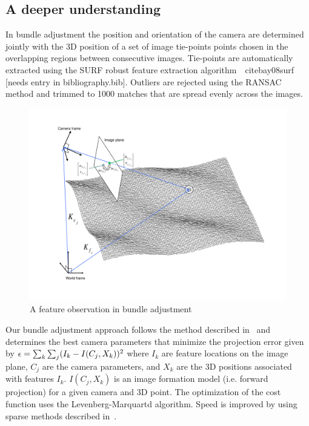 \subsection{A deeper understanding}

In bundle adjustment the position and orientation of the camera are
determined jointly with the 3D position of a set of image tie-points
points chosen in the overlapping regions between consecutive images.
Tie-points are automatically extracted using the SURF robust feature
extraction algorithm~\ cite{bay08surf} [needs entry in bibliography.bib].  Outliers are rejected using
the RANSAC method and trimmed to 1000 matches that are spread evenly
across the images.

\begin{figure}[htp]
  \begin{center}
  \includegraphics[trim=20mm 20mm 20mm 15mm,clip,width=6in]{images/ba_feature_observation.pdf}
  \end{center}
  \caption{ A feature observation in bundle adjustment \citep{moore09} }
  \label{fig:ba_feature}
\end{figure}

Our bundle adjustment approach follows the method described
in~\cite{triggs00} and determines the best camera
parameters that minimize the projection error given by ${\bf \epsilon}
= \sum_k\sum_j(I_k-I(C_j, X_k))^2$ where $I_k$ are feature locations
on the image plane, $C_j$ are the camera parameters, and $X_k$ are the
3D positions associated with features $I_k$. $I(C_j, X_k)$ is an image
formation model (i.e. forward projection) for a given camera and 3D
point.  The optimization of the cost function uses the
Levenberg-Marquartd algorithm. Speed is improved by using sparse
methods described in~\cite{hartley04}.

